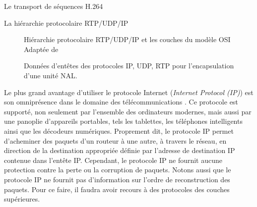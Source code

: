 \documentclass[letterpaper, twoside, 12pt,memoire]{thETS}
\newcommand{\ang}[1]{(\textit{#1})}
\begin{document}
\begin{chapter}{Le transport de séquences H.264}
\begin{section}{La hiérarchie protocolaire RTP/UDP/IP}
\begin{figure}[htb] \centering {} \caption{Hiérarchie protocolaire RTP/UDP/IP et les couches du modèle OSI
\\Adaptée de \citet[p.~339]{Smith2006}}
\label{fig-OSI_Layers}
\end{figure}

\begin{figure}[htb] \centering {} \caption{Données d'entêtes des protocoles IP, UDP, RTP pour l'encapsulation
d'une unité NAL.}
\label{fig-IPUDPRTP}
\end{figure}

Le plus grand avantage d'utiliser le protocole Internet \ang{Internet Protocol
(IP)} est son omniprésence dans le domaine des télécommunications
\citep{Smith2006}. Ce protocole est supporté, non seulement par l'ensemble des
ordinateurs modernes, mais aussi par une panoplie d'appareils portables, tels
les tablettes, les téléphones intelligents ainsi que les décodeurs numériques.
Proprement dit, le protocole IP permet d'acheminer des paquets d'un routeur à
une autre, à travers le réseau, en direction de la destination appropriée
définie par l'adresse de destination IP contenue dans l'entête IP. Cependant, le
protocole IP ne fournit aucune protection contre la perte ou la corruption de
paquets. Notons aussi que le protocole IP ne fournit pas d'information sur
l'ordre de reconstruction des paquets. Pour ce faire, il faudra avoir recours à
des protocoles des couches supérieures.


\end{section}
\end{chapter}
\end{document}
